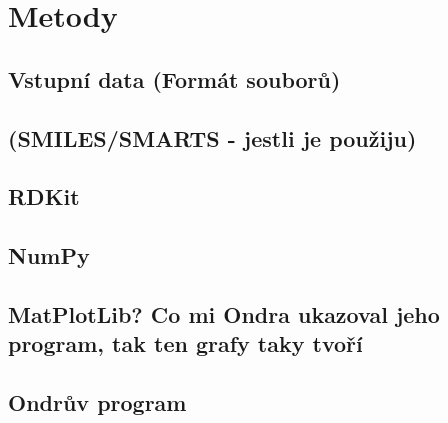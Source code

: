 \chapter{Metody}
\section{Vstupní data (Formát souborů)}
\section{(SMILES/SMARTS - jestli je použiju)}
\section{RDKit}
\section{NumPy}
\section{MatPlotLib? Co mi Ondra ukazoval jeho program, tak ten grafy taky tvoří}
\section{Ondrův program}

